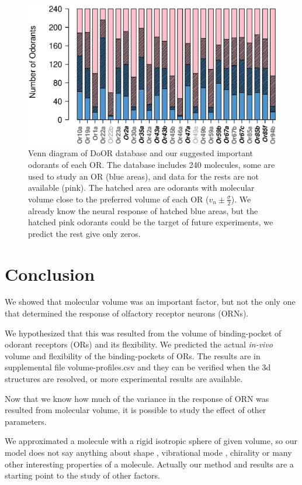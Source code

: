 \documentclass[fleqn,11pt]{wlscirep}
\begin{document}
\begin{figure}
\centering
	\includegraphics[width=\textwidth]{odorant-suggest}
	\caption{Venn diagram of DoOR database and our suggested important odorants of each OR.
			The database includes 240 molecules, 
			some are used to study an OR (blue areas), 
			and data for the rests are not available (pink).
			The hatched area are odorants with molecular volume close to the preferred volume of each OR
			($v_n \pm \frac{\sigma}{2}$).
			We already know the neural response of hatched blue areas, 
			but the hatched pink odorants could be the target of future experiments, we predict the rest give only zeros.
			}
	\label{fig:odorant-suggest}
\end{figure}

\section*{Conclusion}

We showed that molecular volume was an important factor, 
but not the only one that determined the response of olfactory receptor neurons (ORNs). 

We hypothesized that this was resulted from the volume of binding-pocket of odorant receptors (ORs) and its flexibility. 
We predicted the actual \textit{in-vivo} volume and flexibility of the binding-pockets of ORs. 
The results are in supplemental file volume-profiles.csv and they can be verified when the 3d structures are resolved, 
or more experimental results are available. 

Now that we know how much of the variance in the response of ORN was resulted from molecular volume, 
it is possible to study the effect of other parameters.

We approximated a molecule with a rigid isotropic sphere of given volume, 
so our model does not say anything about shape \cite{Keller2004, Araneda2000, uchida2000}, 
vibrational mode \cite{Turin,Franco2011,turin2015plausibility}, 
chirality \cite{tirandaz2015dissipative} or many other interesting properties of a molecule.
Actually our method and results are a starting point to the study of other factors. 
\end{document}
